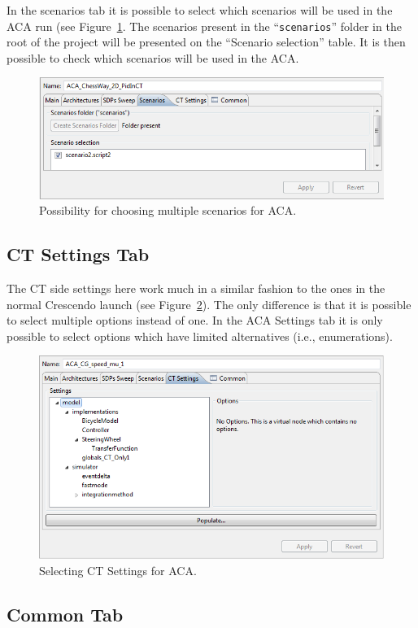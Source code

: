 \documentclass{crescendorepchap}
\begin{document}
In the scenarios tab it is possible to select which scenarios will be
used in the ACA run (see Figure~\ref{fig:ScenariosACATab}. 
The scenarios present in the ``\texttt{scenarios}'' folder
in the root of the project will be presented on the ``Scenario
selection'' table. It is then possible to check which scenarios will be
used in the ACA.

\begin{figure}[htbp]
\centering
\includegraphics[width=.6\textwidth]{images/ScenariosACATab.png}
\caption{Possibility for choosing multiple scenarios for ACA.\label{fig:ScenariosACATab}}
\end{figure}

\subsection{CT Settings Tab}

The CT side settings here work much in a similar fashion to the ones in
the normal
Crescendo launch (see Figure~\ref{fig:SettingsACATab}). 
The only difference is that it is possible to select
multiple options instead of one. In the ACA Settings tab it is only
possible to select options which have limited alternatives (i.e.,
enumerations).

\begin{figure}[htbp]
\centering
\includegraphics[width=.6\textwidth]{images/SettingsACATab.png}
\caption{Selecting CT Settings for ACA.\label{fig:SettingsACATab}}
\end{figure}

\subsection{Common Tab}
\end{document}
